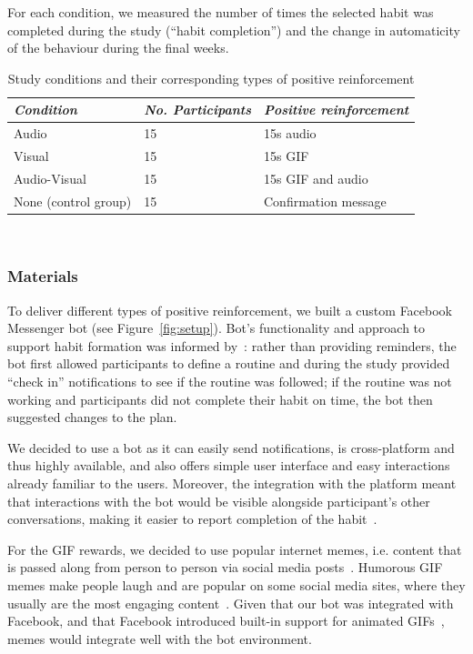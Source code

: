 \documentclass{scaffold/sigchi}
\begin{document}
For each condition, we measured the number of times the selected habit was completed during the study (``habit completion'') and the change in automaticity of the behaviour during the final weeks. 

\begin{table}
  \centering
  \begin{tabular}{l l l}
    {\small\textit{Condition}} & {\small \textit{No. Participants}} & {\small \textit{Positive reinforcement}} \\
    \midrule
    Audio & 15 & 15s audio\\
    Visual & 15 & 15s GIF \\
    Audio-Visual & 15 & 15s GIF and audio \\
    None (control group) & 15 & Confirmation message \\
  \end{tabular}
  \caption{Study conditions and their corresponding types of positive reinforcement}~\label{fig:precise_rewards}
\end{table}

\subsubsection{Materials}
To deliver different types of positive reinforcement, we built a custom Facebook Messenger bot (see Figure~\ref{fig:setup}). Bot's functionality and approach to support habit formation was informed by~\cite{article_beyond_self_tracking_designing_apps}: rather than providing reminders, the bot first allowed participants to define a routine and during the study provided ``check in'' notifications to see if the routine was followed; if the routine was not working and participants did not complete their habit on time, the bot then suggested changes to the plan.

We decided to use a bot as it can easily send notifications, is cross-platform and thus highly available, and also offers simple user interface and easy interactions already familiar to the users. Moreover, the integration with the platform meant that interactions with the bot would be visible alongside participant's other conversations, making it easier to report completion of the habit~\cite{the_power_of_logging_mobile_notifications}.

For the GIF rewards, we decided to use popular internet memes, i.e. content that is passed along from person to person via social media posts~\cite{meme_definition}. Humorous GIF memes make people laugh and are popular on some social media sites, where they usually are the most engaging content~\cite{meme_gifs_are_good}. Given that our bot was integrated with Facebook, and that Facebook introduced built-in support for animated GIFs~\cite{fb_gif_rollout}, memes would integrate well with the bot environment. 
\end{document}
